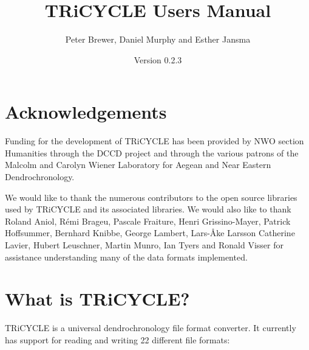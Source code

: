 \documentclass[10pt, headsepline,DIV14,BCOR0.5cm]{scrreprt}
\title{TRiCYCLE Users Manual}
\author{Peter Brewer, Daniel Murphy and Esther Jansma}
\date{Version 0.2.3}
\begin{document}
\maketitle
{}
\setcounter{page}{1}

\tableofcontents


\chapter{Acknowledgements}
\setcounter{page}{1}

Funding for the development of TRiCYCLE has been provided by NWO section Humanities through the
DCCD project and through the various patrons of the Malcolm and Carolyn Wiener Laboratory for Aegean
and Near Eastern Dendrochronology.

We would like to thank the numerous contributors to the open source libraries used by TRiCYCLE and
its associated libraries. We would also like to thank Roland Aniol, Rémi Brageu, Pascale Fraiture,
Henri Grissino-Mayer, Patrick Hoffsummer, Bernhard Knibbe, George Lambert, Lars-Åke Larsson Catherine Lavier, Hubert
Leuschner, Martin Munro, Ian Tyers and Ronald Visser for assistance understanding many of the data
formats implemented.

\chapter{What is TRiCYCLE?}

TRiCYCLE is a universal dendrochronology file format converter. It currently has support for reading and
writing 22 different file formats:
\end{document}
